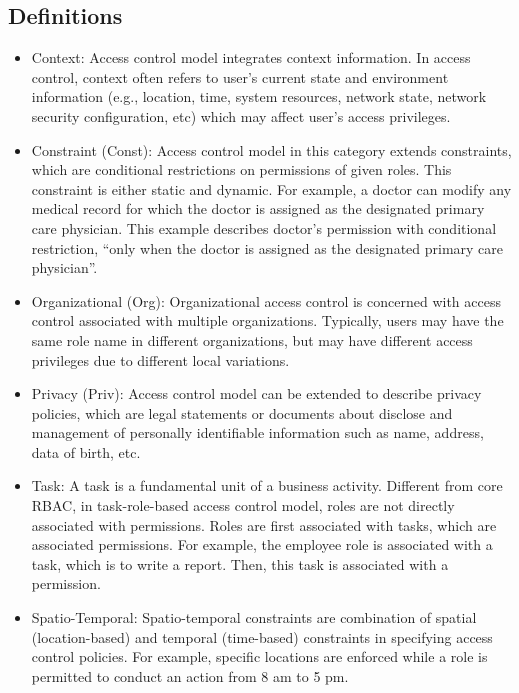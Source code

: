 \subsection{Definitions}

\begin{itemize}

  \item Context: Access control model integrates context information. In access control, context often refers to user's current state and environment information (e.g., location, time, system resources, network state, network security configuration, etc) which may affect user's access privileges.

  \item Constraint (Const): Access control model in this category extends constraints, which are conditional restrictions on permissions of given roles. This constraint is either static and dynamic. For example, a doctor can modify any medical record for which the doctor is assigned as the designated primary care physician. This example describes doctor's permission with conditional restriction, ``only when the doctor is assigned as the designated primary care physician''.

  \item Organizational (Org): Organizational access control is concerned with access control associated with multiple organizations. Typically, users may have the same role name in different organizations, but may have different access privileges due to different local variations.
  
  \item Privacy (Priv): Access control model can be extended to describe privacy policies, which are legal statements or documents about disclose and management of personally identifiable information such as name, address, data of birth, etc.
  
  \item Task: A task is a fundamental unit of a business activity. Different from core RBAC, in task-role-based access control model, roles are not directly associated with permissions. Roles are first associated with tasks, which are associated permissions. For example, the employee role is associated with a task, which is to write a report. Then, this task is associated with a permission.

  \item Spatio-Temporal: Spatio-temporal constraints are combination of spatial (location-based) and temporal (time-based) constraints in specifying access control policies. For example, specific locations are enforced while a role is permitted to conduct an action from 8 am to 5 pm.


\end{itemize}
